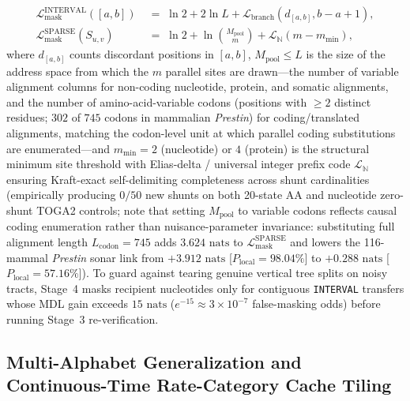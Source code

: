 \documentclass[12pt]{article}
\begin{document}
\begin{enumerate}
    \begin{equation}
        \begin{aligned}
            \mathcal{L}_{\text{mask}}^{\text{INTERVAL}}([a,b]) &\;=\; \ln 2 + 2\ln L + \mathcal{L}_{\text{branch}}(d_{[a,b]}, b - a + 1), \\
            \mathcal{L}_{\text{mask}}^{\text{SPARSE}}(S_{u,v}) &\;=\; \ln 2 + \ln\binom{M_{\text{pool}}}{m} + \mathcal{L}_{\mathbb{N}}(m - m_{\min}),
        \end{aligned}
        \label{eq:shunt_masks}
    \end{equation}
    where $d_{[a,b]}$ counts discordant positions in $[a,b]$, $M_{\text{pool}} \le L$ is the size of the address space from which the $m$ parallel sites are drawn---the number of variable alignment columns for non-coding nucleotide, protein, and somatic alignments, and the number of amino-acid-variable codons (positions with $\ge 2$ distinct residues; $302$ of $745$ codons in mammalian \textit{Prestin}) for coding/translated alignments, matching the codon-level unit at which parallel coding substitutions are enumerated---and $m_{\min} = 2$ (nucleotide) or $4$ (protein) is the structural minimum site threshold with Elias-delta / universal integer prefix code $\mathcal{L}_{\mathbb{N}}$ ensuring Kraft-exact self-delimiting completeness across shunt cardinalities (empirically producing $0/50$ new shunts on both 20-state AA and nucleotide zero-shunt TOGA2 controls; note that setting $M_{\text{pool}}$ to variable codons reflects causal coding enumeration rather than nuisance-parameter invariance: substituting full alignment length $L_{\text{codon}} = 745$ adds $3.624\text{ nats}$ to $\mathcal{L}_{\text{mask}}^{\text{SPARSE}}$ and lowers the 116-mammal \textit{Prestin} sonar link from $+3.912\text{ nats}$ [$P_{\text{local}} = 98.04\%$] to $+0.288\text{ nats}$ [$P_{\text{local}} = 57.16\%$]). To guard against tearing genuine vertical tree splits on noisy tracts, Stage~4 masks recipient nucleotides only for contiguous \texttt{INTERVAL} transfers whose MDL gain exceeds $15\text{ nats}$ ($e^{-15} \approx 3\times 10^{-7}$ false-masking odds) before running Stage~3 re-verification.
\end{enumerate}

\subsection*{Multi-Alphabet Generalization and Continuous-Time Rate-Category Cache Tiling}
\end{document}
